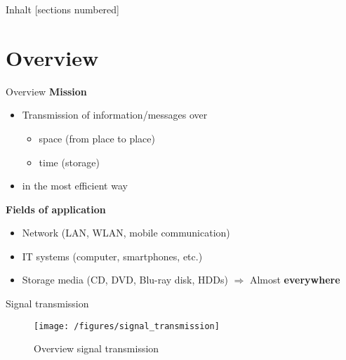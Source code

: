 \documentclass[ngerman]{beamer}
\title[\titlename]{\titlename}
\author{Dominik Gedon}
\date{27. Januar 2020}
\begin{document}
\maketitle

\begin{frame}[plain]{Inhalt}
	[sections numbered]
	\tableofcontents[hideallsubsections]
\end{frame}


\section{Overview}
\begin{frame}{Overview}
	\textbf{Mission}
	\begin{itemize}[label={-}, itemsep=2ex]
		\item Transmission of information/messages over
		\begin{itemize}[label={}]
			\item space (from place to place)
			\item time (storage)
		\end{itemize}
		\item in the most efficient way
	\end{itemize} 
	
	\textbf{Fields of application}
	\begin{itemize}[label={-}, itemsep=1ex]
		\item Network (LAN, WLAN, mobile communication)
		\item IT systems (computer, smartphones, etc.)
		\item Storage media (CD, DVD, Blu-ray disk, HDDs)\newline
		$\Longrightarrow$ Almost \textbf{\alert{everywhere}}	
	\end{itemize} 
\end{frame}


\begin{frame}{Signal transmission}
	\begin{figure}[htbp]
 	 	\centering 	
 		\texttt{[image: /figures/signal\_transmission]} 	 
 		\caption {Overview signal transmission \cite{friedrichs}}
	\end{figure}
\end{frame}
\end{document}
